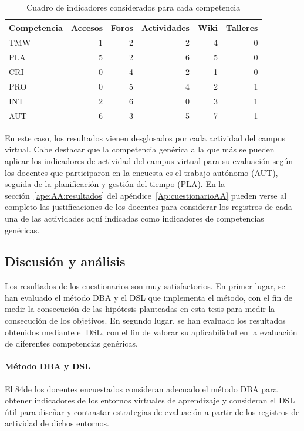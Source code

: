 \begin{table}
	\centering
	\caption{Cuadro de indicadores considerados para cada competencia}
	\label{tab:indicador:competencia}
	\begin{tabular}{|L{3.8cm}|r|r|r|r|r|}
		\hline
		Competencia & Accesos & Foros & Actividades & Wiki & Talleres \\
		\hline
		\hline
		TMW & 1 & 2 & 2 & 4 & 0  \\
		\hline
		PLA & 5 & 2 & 6 & 5 & 0  \\
		\hline
		CRI & 0 & 4 & 2 & 1 & 0  \\
		\hline
		PRO & 0 & 5 & 4 & 2 & 1 \\
		\hline
		INT & 2 & 6 & 0 & 3 & 1 \\
		\hline
		AUT & 6 & 3 & 5 & 7 & 1 \\
		\hline
	\end{tabular}
\end{table}

En este caso, los resultados vienen desglosados por cada actividad del campus virtual. Cabe destacar que la competencia genérica a la que más se pueden aplicar los indicadores de actividad del campus virtual para su evaluación según los docentes que participaron en la encuesta es el trabajo autónomo (AUT), seguida de la planificación y gestión del tiempo (PLA). En la sección~\ref{ape:AA:resultados} del apéndice~\ref{Ap:cuestionarioAA} pueden verse al completo las justificaciones de los docentes para considerar los registros de cada una de las actividades aquí indicadas como indicadores de competencias genéricas.

\subsection{Discusión y análisis}

Los resultados de los cuestionarios son muy satisfactorios. En primer lugar, se han evaluado el método DBA y el DSL que implementa el método, con el fin de medir la consecución de las hipótesis planteadas en esta tesis para medir la consecución de los objetivos. En segundo lugar, se han evaluado los resultados obtenidos mediante el DSL, con el fin de valorar su aplicabilidad en la evaluación de diferentes competencias genéricas.

\paragraph*{Método DBA y DSL}
El 84\percentage{ }de los docentes encuestados consideran adecuado el método DBA para obtener indicadores de los entornos virtuales de aprendizaje y consideran el DSL útil para diseñar y contrastar estrategias de evaluación a partir de los registros de actividad de dichos entornos. 

